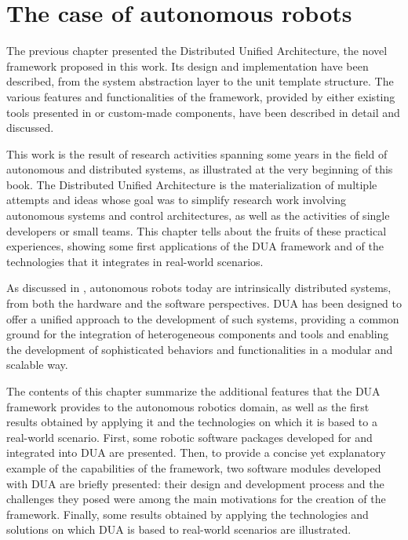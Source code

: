 \chapter{The case of autonomous robots}
\label{ch:robots}
\vspace{-1.3cm}

The previous chapter presented the Distributed Unified Architecture, the novel framework proposed in this work. Its design and implementation have been described, from the system abstraction layer to the unit template structure. The various features and functionalities of the framework, provided by either existing tools presented in  or custom-made components, have been described in detail and discussed.

This work is the result of research activities spanning some years in the field of autonomous and distributed systems, as illustrated at the very beginning of this book. The Distributed Unified Architecture is the materialization of multiple attempts and ideas whose goal was to simplify research work involving autonomous systems and control architectures, as well as the activities of single developers or small teams. This chapter tells about the fruits of these practical experiences, showing some first applications of the DUA framework and of the technologies that it integrates in real-world scenarios.

As discussed in , autonomous robots today are intrinsically distributed systems, from both the hardware and the software perspectives. DUA has been designed to offer a unified approach to the development of such systems, providing a common ground for the integration of heterogeneous components and tools and enabling the development of sophisticated behaviors and functionalities in a modular and scalable way.

The contents of this chapter summarize the additional features that the DUA framework provides to the autonomous robotics domain, as well as the first results obtained by applying it and the technologies on which it is based to a real-world scenario. First, some robotic software packages developed for and integrated into DUA are presented. Then, to provide a concise yet explanatory example of the capabilities of the framework, two software modules developed with DUA are briefly presented: their design and development process and the challenges they posed were among the main motivations for the creation of the framework. Finally, some results obtained by applying the technologies and solutions on which DUA is based to real-world scenarios are illustrated.




